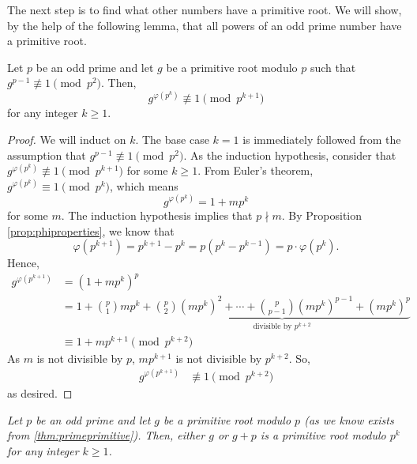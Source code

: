 \documentclass{subfile}
\begin{document}
The next step is to find what other numbers have a primitive root. We will show, by the help of the following lemma, that all powers of an odd prime number have a primitive root.

	\begin{lemma}
		Let $p$ be an odd prime and let $g$ be a primitive root modulo $p$ such that $g^{p-1} \not \equiv 1 \pmod{p^2}$. Then, $$g^{\varphi(p^k)} \not \equiv 1 \pmod{p^{k+1}}$$ for any integer $k \geq 1$.
	\end{lemma}

	\begin{proof}
		We will induct on $k$. The base case $k=1$ is immediately followed from the assumption that $g^{p-1} \not \equiv 1 \pmod{p^2}$. As the induction hypothesis, consider that $g^{\varphi(p^k)} \not \equiv 1 \pmod{p^{k+1}}$ for some $k\geq 1$. From Euler's theorem, $g^{\varphi(p^k)} \equiv 1 \pmod{p^k}$, which means $$g^{\varphi(p^k)} = 1+mp^k$$ for some $m$. The induction hypothesis implies that $p \nmid m$. By Proposition \ref{prop:phiproperties}, we know that $$\varphi(p^{k+1})=p^{k+1}-p^k=p\left(p^k - p^{k-1}\right)=p\cdot \varphi(p^k).$$
		Hence,
			\begin{align*}
				g^{\varphi(p^{k+1})}
					& = (1+mp^k)^p \\
					& = 1+ \binom{p}{1}mp^k + \underbrace{\binom{p}{2} (mp^k)^2 + \cdots +\binom{p}{p-1} (mp^k)^{p-1} +(mp^k)^p}_{\mbox{divisible by }p^{k+2}}\\
					& \equiv 1+mp^{k+1} \pmod {p^{k+2}}
			\end{align*}
		As $m$ is not divisible by $p$, $mp^{k+1}$ is not divisible by $p^{k+2}$. So,
			\begin{align*}
				g^{\varphi(p^{k+1})}
					& \not \equiv 1 \pmod {p^{k+2}}
			\end{align*}
		as desired.
	\end{proof}

	\begin{theorem}\slshape\label{thm:primepowerprimitive}
		Let $p$ be an odd prime and let $g$ be a primitive root modulo $p$ (as we know exists from \autoref{thm:primeprimitive}). Then, either $g$ or $g+p$ is a primitive root modulo $p^k$ for any integer $k\geq 1$.
	\end{theorem}
\end{document}

